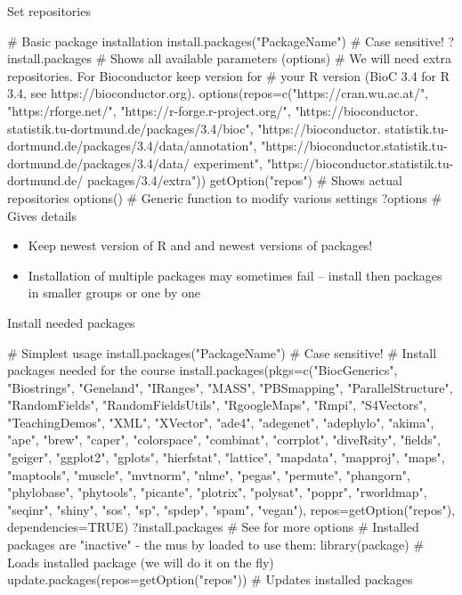 \documentclass[compress, ucs, xelatex, 11pt, xcolor=svgnames,
  hyperref={
    bookmarks=true,
    unicode=true,
    colorlinks=true,
    pdftitle={Molecular data in R},
    plainpages=false,
    pdfauthor={Vojtech Zeisek},
    pdfsubject={Course about phylogeny and evolution in R},
    pdfcreator={XeLaTeX},
    pdfkeywords={R, evolution, phylogeny, molecular data},
    linkcolor=Tomato,
    anchorcolor=SaddleBrown,
    citecolor=Goldenrod,
    filecolor=DarkMagenta,
    menucolor=Sienna,
    urlcolor=DarkTurquoise,
    pdftex},
  url={hyphens, lowtilde} %
  ]{beamer}
\begin{document}
\begin{frame}[fragile, label=repos]{Set repositories}
  \begin{spluscode}
    # Basic package installation
    install.packages("PackageName") # Case sensitive!
    ?install.packages # Shows all available parameters (options)
    # We will need extra repositories. For Bioconductor keep version for
    # your R version (BioC 3.4 for R 3.4, see https://bioconductor.org).
    options(repos=c("https://cran.wu.ac.at/", "https:/rforge.net/",
      "https://r-forge.r-project.org/", "https://bioconductor.
      statistik.tu-dortmund.de/packages/3.4/bioc", "https://bioconductor.
      statistik.tu-dortmund.de/packages/3.4/data/annotation", 
      "https://bioconductor.statistik.tu-dortmund.de/packages/3.4/data/
      experiment", "https://bioconductor.statistik.tu-dortmund.de/
      packages/3.4/extra"))
    getOption("repos") # Shows actual repositories
    options() # Generic function to modify various settings
    ?options # Gives details
  \end{spluscode}
\begin{itemize}
 \item \alert{Keep newest version of R and and newest versions of packages!}
 \item Installation of multiple packages may sometimes fail -- install then packages in smaller groups or one by one
\end{itemize}
\end{frame}

\begin{frame}[fragile]{Install needed packages}
  \begin{spluscode}
    # Simplest usage
    install.packages("PackageName") # Case sensitive!
    # Install packages needed for the course
    install.packages(pkgs=c("BiocGenerics", "Biostrings", "Geneland",
      "IRanges", "MASS", "PBSmapping", "ParallelStructure", "RandomFields",
      "RandomFieldsUtils", "RgoogleMaps", "Rmpi", "S4Vectors",
      "TeachingDemos", "XML", "XVector", "ade4", "adegenet", "adephylo",
      "akima", "ape", "brew", "caper", "colorspace", "combinat", "corrplot",
      "diveRsity", "fields", "geiger", "ggplot2", "gplots", "hierfstat",
      "lattice", "mapdata", "mapproj", "maps", "maptools", "muscle",
      "mvtnorm", "nlme", "pegas", "permute", "phangorn", "phylobase",
      "phytools", "picante", "plotrix", "polysat", "poppr", "rworldmap",
      "seqinr", "shiny", "sos", "sp", "spdep", "spam", "vegan"),
      repos=getOption("repos"), dependencies=TRUE)
    ?install.packages # See for more options
    # Installed packages are "inactive" - the mus by loaded to use them:
    library(package) # Loads installed package (we will do it on the fly)
    update.packages(repos=getOption("repos")) # Updates installed packages
  \end{spluscode}
\end{frame}
\end{document}
